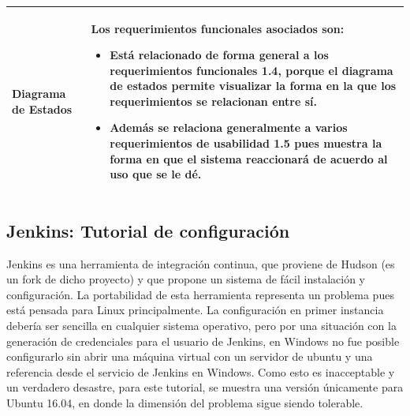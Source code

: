\documentclass[a4paper]{article}
\newcommand\tab[1][0.55cm]{\hspace*{#1}}
\begin{document}
{\begin{table}[h!]
\begin{tabularx}{\textwidth}{|p{5cm}|p{9.1cm}|}
\end{tabularx}
\caption*{\color{Red} \color{Black}}
\end{table}

\newpage
\begin{table}[h!]
\begin{tabularx}{\textwidth}{|p{5cm}|p{9.1cm}|}
  
  \hline
  Diagrama de Estados&
    Los requerimientos funcionales asociados son:
  \begin{itemize}
  \item Está relacionado de forma general a los requerimientos funcionales 1.4, porque el diagrama de estados permite visualizar la forma en la que los requerimientos se relacionan entre sí. 
  \item Además se relaciona generalmente a varios requerimientos de usabilidad 1.5 pues muestra la forma en que el sistema reaccionará de acuerdo al uso que se le dé. 
  \end{itemize}\\ 
  \hline
\end{tabularx}
\caption*{\color{Red} \color{Black}}
\end{table}
  


\newpage
\color{Blue}
\centering{ \rule{16cm}{0.1cm} } 
\justify 
\subsection{\textbf{Jenkins: Tutorial de configuración}}
\color{black}

\justify 

\tab Jenkins es una herramienta de integración continua, que proviene de Hudson (es un fork de dicho proyecto) y que propone un sistema de fácil instalación y configuración. La portabilidad de esta herramienta representa un problema pues está pensada para Linux principalmente. La configuración en primer instancia debería ser sencilla en cualquier sistema operativo, pero por una situación con la generación de credenciales para el usuario de Jenkins, en Windows no fue posible configurarlo sin abrir una máquina virtual con un servidor de ubuntu y una referencia desde el servicio de Jenkins en Windows. Como esto es inacceptable y un verdadero desastre, para este tutorial, se muestra una versión únicamente para Ubuntu 16.04, en donde la dimensión del problema sigue siendo tolerable. 

}
\end{document}
